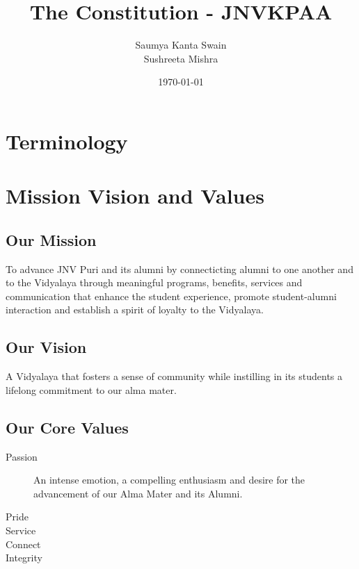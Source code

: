 \documentclass[a4paper,11pt]{book}
\title{The Constitution - JNVKPAA}
\author{Saumya Kanta Swain \\
Sushreeta Mishra}
\date{\today}
\begin{document}
\maketitle
\tableofcontents

\chapter*{Terminology}


\chapter{Mission Vision and Values}

\section{Our Mission}
To advance JNV Puri and its alumni by connecticting alumni to one another and to the Vidyalaya through meaningful programs, benefits, services and communication that enhance the student experience, promote student-alumni interaction and establish a spirit of loyalty to the Vidyalaya.

\section{Our Vision}
A Vidyalaya that fosters a sense of community while instilling in its students a lifelong commitment to our alma mater.

\section{Our Core Values}
\begin{description}
\item [Passion] An intense emotion, a compelling enthusiasm and desire for the advancement of our Alma Mater and its Alumni.
\item [Pride] 
\item [Service]
\item [Connect]
\item [Integrity]
\end{description}
\end{document}
